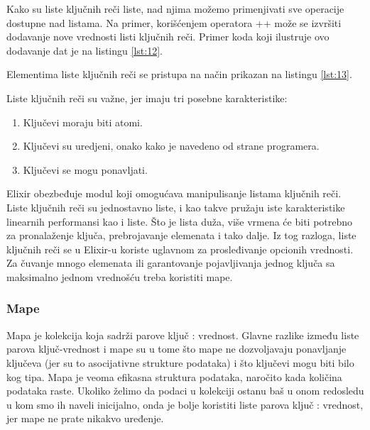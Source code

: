 \documentclass[12pt,oneside]{memoir}
\begin{document}


Kako su liste ključnih reči liste, nad njima možemo primenjivati sve operacije dostupne nad listama. Na primer, korišćenjem operatora ++ može se izvršiti dodavanje nove vrednosti listi ključnih reči. Primer koda koji ilustruje ovo dodavanje dat je na listingu \ref{lst:12}.



Elementima liste ključnih reči se pristupa na način prikazan na listingu \ref{lst:13}.



Liste ključnih reči su važne, jer imaju tri posebne karakteristike:
\begin{enumerate}
\itemsep0em 
\item{Ključevi moraju biti atomi.}
\item{Ključevi su uredjeni, onako kako je navedeno od strane programera.}
\item{Ključevi se mogu ponavljati.}
\end{enumerate}

Elixir obezbeđuje modul koji omogućava manipulisanje listama ključnih reči. Liste ključnih reči su jednostavno liste, i kao takve pružaju iste karakteristike linearnih performansi kao i liste. Što je lista duža, više vrmena će biti potrebno za pronalaženje ključa, prebrojavanje elemenata i tako dalje. Iz tog razloga, liste ključnih reči se u Elixir-u koriste uglavnom za prosleđivanje opcionih vrednosti. Za čuvanje mnogo elemenata ili garantovanje pojavljivanja jednog ključa sa maksimalno jednom vrednošću treba koristiti mape.
 
\subsubsection{Mape}
Mapa je kolekcija koja sadrži parove ključ : vrednost. Glavne razlike između liste parova ključ-vrednost i mape su u tome što mape ne dozvoljavaju ponavljanje ključeva (jer su to asocijativne strukture podataka) i što ključevi mogu biti bilo kog tipa. Mapa je veoma efikasna struktura podataka, naročito kada količina podataka raste. Ukoliko želimo da podaci u kolekciji ostanu baš u onom redosledu u kom smo ih naveli inicijalno, onda je bolje koristiti liste parova ključ : vrednost, jer mape ne prate nikakvo uređenje.
\end{document}
